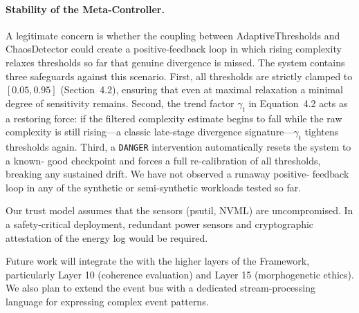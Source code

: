 \paragraph{Stability of the Meta‑Controller.}
A legitimate concern is whether the coupling between AdaptiveThresholds
and ChaosDetector could create a positive‑feedback loop in which rising
complexity relaxes thresholds so far that genuine divergence is missed.
The system contains three safeguards against this scenario.  First, all
thresholds are strictly clamped to $[0.05,0.95]$ (Section~4.2),
ensuring that even at maximal relaxation a minimal degree of sensitivity
remains.  Second, the trend factor $\gamma_t$ in Equation~4.2 acts as a
restoring force: if the filtered complexity estimate begins to fall
while the raw complexity is still rising—a classic late‑stage
divergence signature—$\gamma_t$ tightens thresholds again.  Third, a
\texttt{DANGER} intervention automatically resets the system to a known‑
good checkpoint and forces a full re‑calibration of all thresholds,
breaking any sustained drift.  We have not observed a runaway positive‑
feedback loop in any of the synthetic or semi‑synthetic workloads tested
so far.

Our trust model assumes that the sensors (psutil, NVML) are
uncompromised.  In a safety‑critical deployment, redundant power
sensors and cryptographic attestation of the energy log would be
required.

Future work will integrate the \Core{} with the higher layers of the
\Apeiron{} Framework, particularly Layer 10 (coherence evaluation) and
Layer 15 (morphogenetic ethics).  We also plan to extend the event bus
with a dedicated stream‑processing language for expressing complex
event patterns.